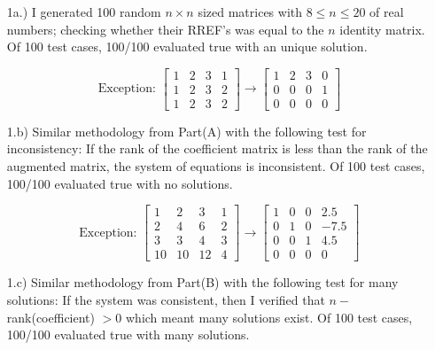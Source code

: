 \documentclass[10pt]{article}
\begin{document}
\noindent{}
\normalsize
\begin{enumerate}[leftmargin=\labelsep]
    \item[1a.)] I generated 100 random $n\times n$ sized matrices with $8 \leq n \leq 20$ of real numbers; checking whether their RREF's was equal to the $n$ identity matrix. Of 100 test cases, 100/100 evaluated true with an unique solution. 
    
        $$ \text{Exception: } \begin{bmatrix}\label{eq1}
        1 & 2 & 3 & 1\\
        1 & 2 & 3 & 2\\
        1 & 2 & 3 & 2
        \end{bmatrix} 
        \to
        \begin{bmatrix}
        1 & 2 & 3 & 0\\
        0 & 0 & 0 & 1\\
        0 & 0 & 0 & 0
        \end{bmatrix}
        $$
    
    \item[1.b)] Similar methodology from Part(A) with the following test for inconsistency: If the rank of the coefficient matrix is less than the rank of the augmented matrix, the system of equations is inconsistent. Of 100 test cases, 100/100 evaluated true with no solutions. 
    
        $$ \text{Exception: } \begin{bmatrix}\label{eq1}
        1 & 2 & 3 & 1\\
        2 & 4 & 6 & 2\\
        3 & 3 & 4 & 3\\
        10 & 10 & 12 & 4
        \end{bmatrix} 
        \to
        \begin{bmatrix}
        1 & 0 & 0 & 2.5\\
        0 & 1 & 0 & -7.5\\
        0 & 0 & 1 & 4.5\\
        0 & 0 & 0 & 0
        \end{bmatrix}$$

    \item[1.c)] Similar methodology from Part(B) with the following test for many solutions: If the system was consistent, then I verified that $n -$ rank(coefficient) $> 0$ which meant many solutions exist. Of 100 test cases, 100/100 evaluated true with many solutions.


\end{enumerate}
\end{document}
